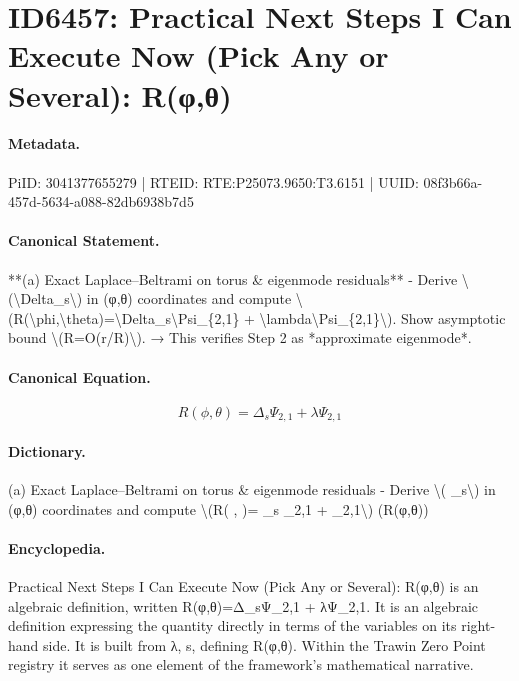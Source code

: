 \section*{ID6457: Practical Next Steps I Can Execute Now (Pick Any or Several): R(φ,θ)}
\paragraph{Metadata.}
PiID: 3041377655279 | RTEID: RTE:P25073.9650:T3.6151 | UUID: 08f3b66a-457d-5634-a088-82db6938b7d5

\paragraph{Canonical Statement.}
**(a) Exact Laplace–Beltrami on torus \& eigenmode residuals** - Derive \textbackslash{}(\textbackslash{}Delta\_s\textbackslash{}) in (φ,θ) coordinates and compute \textbackslash{}(R(\textbackslash{}phi,\textbackslash{}theta)=\textbackslash{}Delta\_s\textbackslash{}Psi\_\{2,1\} + \textbackslash{}lambda\textbackslash{}Psi\_\{2,1\}\textbackslash{}). Show asymptotic bound \textbackslash{}(R=O(r/R)\textbackslash{}). → This verifies Step 2 as *approximate eigenmode*.

\paragraph{Canonical Equation.}
\[
R(\phi,\theta)=\Delta_s\Psi_{2,1} + \lambda\Psi_{2,1}
\]

\paragraph{Dictionary.}
(a) Exact Laplace–Beltrami on torus \& eigenmode residuals - Derive \textbackslash{}( \_s\textbackslash{}) in (φ,θ) coordinates and compute \textbackslash{}(R( , )= \_s \_2,1 + \_2,1\textbackslash{}) (R(φ,θ))

\paragraph{Encyclopedia.}
Practical Next Steps I Can Execute Now (Pick Any or Several): R(φ,θ) is an algebraic definition, written R(φ,θ)=Δ\_sΨ\_2,1 + λΨ\_2,1. It is an algebraic definition expressing the quantity directly in terms of the variables on its right-hand side. It is built from λ, s, defining R(φ,θ). Within the Trawin Zero Point registry it serves as one element of the framework's mathematical narrative.
